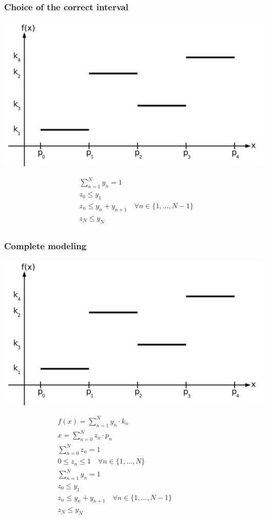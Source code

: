 \begin{frame}
 \frametitle{Choice of the correct interval}
 \begin{flushright}
  \includegraphics[width=.5\textwidth,page=3]{Bilder/Treppenfunktion}
 \end{flushright}
 \vspace{-5ex}
 \begin{align*}
  &\sum_{n=1}^{N}{y_n} = 1\\
  &z_0 \leq y_1\\
  &z_n \leq y_n + y_{n+1}\quad\forall n\in\{1, \ldots, N-1\}\\
  &z_N \leq y_N\\
 \end{align*}
\end{frame}

\begin{frame}
 \frametitle{Complete modeling}
 \begin{flushright}
  \includegraphics[width=.5\textwidth,page=3]{Bilder/Treppenfunktion}
 \end{flushright}
 \vspace{-15ex}\small
 \begin{align*}
  &f(x) = \sum_{n=1}^N y_n\cdot k_n\\
  &x = \sum_{n=0}^{N} z_n\cdot p_n\\
  &\sum_{n=0}^N z_n = 1\\
  &0 \leq z_n \leq 1\quad\forall n\in\{1, \ldots, N\}\\
  &\sum_{n=1}^{N}{y_n} = 1\\
  &z_0 \leq y_1\\
  &z_n \leq y_n + y_{n+1}\quad\forall n\in\{1, \ldots, N-1\}\qquad\qquad\qquad\mbox{}\\
  &z_N \leq y_N\\
 \end{align*}
\end{frame}


